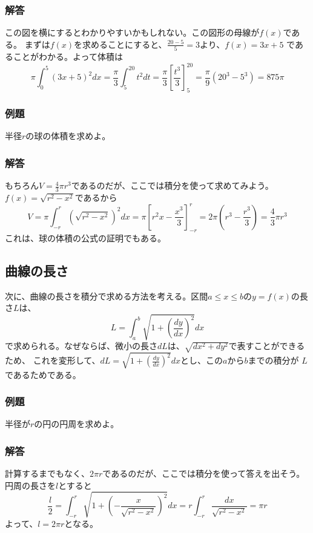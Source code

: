 \documentclass[a4j,dvipdfmx]{jsarticle}
\begin{document}
\subsubsection*{解答}
この図を横にするとわかりやすいかもしれない。この図形の母線が$f(x)$である。
まずは$f(x)$を求めることにすると、$\displaystyle \frac{20-5}{5}=3$より、$f(x)=3x+5$
であることがわかる。よって体積は
\begin{equation*}
    \pi\int_0^5(3x+5)^2dx =\frac{\pi}{3}\int_5^{20} t^2dt=\frac{\pi}{3}\left[\frac{t^3}{3}\right]_5^{20}=\frac{\pi}{9}(20^3-5^3)=875\pi
\end{equation*}
\subsubsection*{例題}
半径$r$の球の体積を求めよ。
\subsubsection*{解答}
もちろん$V=\frac{4}{3}\pi r^3$であるのだが、ここでは積分を使って求めてみよう。$f(x)=\sqrt{r^2-x^2}$であるから
\begin{equation*}
    V=\pi\int_{-r}^{r}(\sqrt{r^2-x^2})^2dx=\pi\left[r^2x -\frac{x^3}{3}\right]_{-r}^r
    =2\pi\left(r^3-\frac{r^3}{3}\right)=\frac{4}{3}\pi r^3
\end{equation*}
これは、球の体積の公式の証明でもある。
\subsection{曲線の長さ}
次に、曲線の長さを積分で求める方法を考える。区間$a\leq x\leq b$の$y=f(x)$の長さ$L$は、
\begin{equation*}
    L=\int_a^b \sqrt{1+\left(\frac{dy}{dx}\right)^2}dx
\end{equation*}
で求められる。なぜならば、微小の長さ$dL$は、$\sqrt{dx^2+dy^2}$で表すことができるため、
これを変形して、$dL=\sqrt{1+\left(\frac{dy}{dx}\right)^2}dx$とし、この$a$から$b$までの積分が
$L$であるためである。
\subsubsection*{例題}
半径が$r$の円の円周を求めよ。
\subsubsection*{解答}
計算するまでもなく、$2\pi r$であるのだが、ここでは積分を使って答えを出そう。円周の長さを$l$とすると
\begin{equation*}
    \frac{l}{2}=\int_{-r}^r \sqrt{1+\left(-\frac{x}{\sqrt{r^2-x^2}}\right)^2}dx=r\int_{-r}^r \frac{dx}{\sqrt{r^2-x^2}}=\pi r
\end{equation*}
よって、$l=2\pi r$となる。
\end{document}
